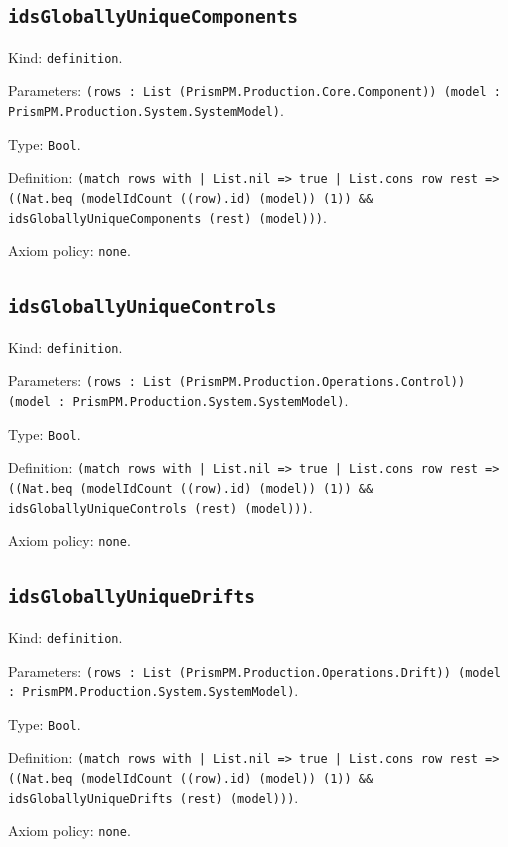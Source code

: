 \documentclass[11pt]{article}
\begin{document}
\subsection*{\texttt{idsGloballyUniqueComponents}}
\noindent Kind: \texttt{definition}.\par
\noindent Parameters: \texttt{(rows : List (PrismPM.Production.Core.Component)) (model : PrismPM.Production.System.SystemModel)}.\par
\noindent Type: \texttt{Bool}.\par
\noindent Definition: \texttt{(match rows with | List.nil => true | List.cons row rest => ((Nat.beq (modelIdCount ((row).id) (model)) (1)) \&\& idsGloballyUniqueComponents (rest) (model)))}.\par
\noindent Axiom policy: \texttt{none}.\par
\subsection*{\texttt{idsGloballyUniqueControls}}
\noindent Kind: \texttt{definition}.\par
\noindent Parameters: \texttt{(rows : List (PrismPM.Production.Operations.Control)) (model : PrismPM.Production.System.SystemModel)}.\par
\noindent Type: \texttt{Bool}.\par
\noindent Definition: \texttt{(match rows with | List.nil => true | List.cons row rest => ((Nat.beq (modelIdCount ((row).id) (model)) (1)) \&\& idsGloballyUniqueControls (rest) (model)))}.\par
\noindent Axiom policy: \texttt{none}.\par
\subsection*{\texttt{idsGloballyUniqueDrifts}}
\noindent Kind: \texttt{definition}.\par
\noindent Parameters: \texttt{(rows : List (PrismPM.Production.Operations.Drift)) (model : PrismPM.Production.System.SystemModel)}.\par
\noindent Type: \texttt{Bool}.\par
\noindent Definition: \texttt{(match rows with | List.nil => true | List.cons row rest => ((Nat.beq (modelIdCount ((row).id) (model)) (1)) \&\& idsGloballyUniqueDrifts (rest) (model)))}.\par
\noindent Axiom policy: \texttt{none}.\par
\end{document}
